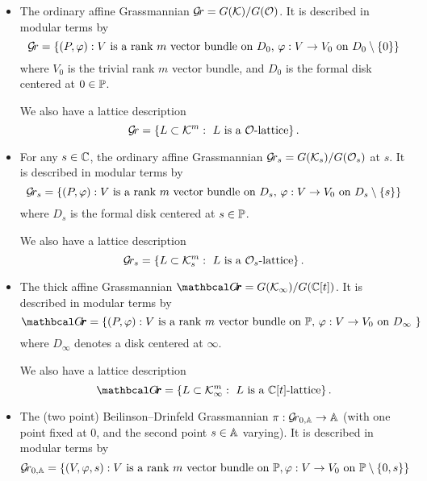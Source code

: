 \documentclass[draft]{article}
\begin{document}
\begin{itemize}
    \item The ordinary affine Grassmannian $\Gr = G(\cK)/G(\cO)$. It is described in modular terms by 
    $$
    \Gr = \{ (P, \varphi) : \text{$V$ is a rank $m$ vector bundle on $ D_0 $, $\varphi : V \rightarrow V_0 $ on $ D_0 \setminus \{0\} $} \} 
    $$
    where $V_0$ is the trivial rank $m$ vector bundle, and $ D_0$ is the formal disk centered at $ 0 \in \PP$.
    
    We also have a lattice description 
    $$ 
    \Gr = \{ L \subset \cK^m : \text{ $L$ is a $\cO$-lattice} \}\,.
    $$
    \item For any $ s \in \CC $,  the ordinary affine Grassmannian $\Gr_s = G(\cK_s)/G(\cO_s)$ at $ s $. It is described in modular terms by
    $$
    \Gr_s = \{ (P, \varphi) : \text{$V$ is a rank $m$ vector bundle on $ D_s $, $\varphi : V \rightarrow V_0 $ on $ D_s \setminus \{s\} $} \} 
    $$
    where $D_s$ is the formal disk centered at $s\in\PP$.

    We also have a lattice description 
    $$ 
    \Gr_s = \{ L \subset \cK_s^m : \text{ $L$ is a $\cO_s$-lattice} \} \,. 
    $$   
    \item The thick affine Grassmannian $\Grth = G(\Kinf)/G(\CC[t])$. %
    It is described in modular terms by
    $$
        \Grth = \{ (P, \varphi) : \text{$V$ is a rank $m$ vector bundle on $ \PP $, $\varphi : V \rightarrow V_0 $ on $ D_\infty $ } \} %
    $$
    where $D_\infty$ denotes a disk centered at $ \infty$. 
    
    We also have a lattice description 
    $$ 
    \Grth = \{ L \subset  \Kinf^m : \text{ $L$ is a $\CC[t]$-lattice} \}\,.
    $$ %
    
       

    \item The (two point) Beilinson--Drinfeld Grassmannian $\pi : \Grbd\to \AA$ (with one point fixed at 0, and the second point $s\in\AA$ varying).
    It is described in modular terms by
    $$
    \Grbd = 
        \left\{ 
            (V,\varphi,s) : V\text{ is a rank $m$ vector bundle on }\PP, \varphi : V \rightarrow V_0 \text{ on } \PP \setminus \{0, s\}  
        \right\} 
    $$%


\end{itemize}
\end{document}
